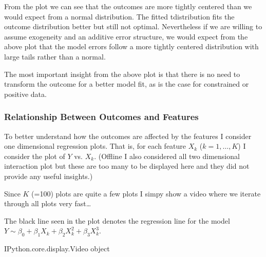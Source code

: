 \documentclass[letterpaper,10pt,english]{sphinxmanual}
\begin{document}
\noindent{}

From the plot we can see that the outcomes are more tightly centered than we would expect from a normal distribution. The fitted t\sphinxhyphen{}distribution fits the outcome distribution better but still not optimal. Nevertheless if we are willing to assume exogeneity and an additive error structure, we would expect from the above plot that the model errors follow a more tightly centered distribution with large tails rather than a normal.

The most important insight from the above plot is that there is no need to transform the outcome for a better model fit, as is the case for constrained or positive data.


\subsubsection{Relationship Between Outcomes and Features}
\label{\detokenize{simulated_reverse_engineering:relationship-between-outcomes-and-features}}
To better understand how the outcomes are affected by the features I consider one dimensional regression plots. That is, for each feature \(X_k\) (\(k=1,\dots,K\)) I consider the plot of \(Y\) vs. \(X_k\).
(Offline I also considered all two dimensional interaction plot but these are too many to be displayed here and they did not provide any useful insights.)

Since \(K\) (=100) plots are quite a few plots I simpy show a video where we iterate through all plots very fast…

The black line seen in the plot denotes the regression line for the model \(Y \sim \beta_0 + \beta_1 X_k + \beta_2 X_k^2 + \beta_3 X_k^3\).

\begin{sphinxVerbatim}[commandchars=\\\{\}]
      
\end{sphinxVerbatim}

\begin{sphinxVerbatim}[commandchars=\\\{\}]
\PYGZlt{}IPython.core.display.Video object\PYGZgt{}
\end{sphinxVerbatim}
\end{document}

